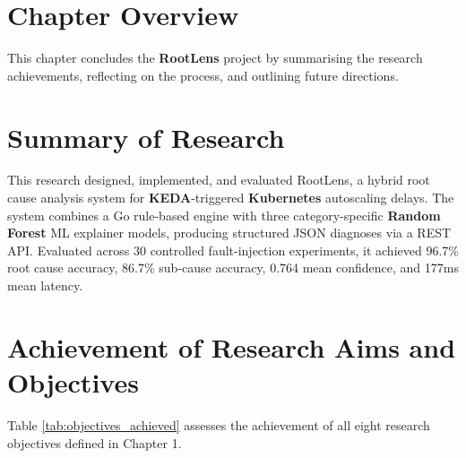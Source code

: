 
\section{Chapter Overview}
This chapter concludes the \textbf{RootLens} project by summarising the research achievements, reflecting on the process, and outlining future directions.

\section{Summary of Research}
This research designed, implemented, and evaluated RootLens, a hybrid root cause analysis system for \textbf{KEDA}-triggered \textbf{Kubernetes} autoscaling delays. The system combines a Go rule-based engine with three category-specific \textbf{Random Forest} ML explainer models, producing structured JSON diagnoses via a REST API. Evaluated across 30 controlled fault-injection experiments, it achieved 96.7\% root cause accuracy, 86.7\% sub-cause accuracy, 0.764 mean confidence, and 177ms mean latency.

\section{Achievement of Research Aims and Objectives}
Table \ref{tab:objectives_achieved} assesses the achievement of all eight research objectives defined in Chapter 1.

